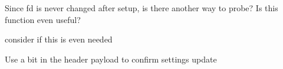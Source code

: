 
\begin{DoxyRefList}
\item[\label{todo__todo000001}%
\Hypertarget{todo__todo000001}%
Member \hyperlink{classtoposens__driver_1_1Serial_a43c68993fde1277eff277428d17b47c0}{toposens\+\_\+driver\+:\+:Serial\+:\+:is\+Alive} ()]Since fd is never changed after setup, is there another way to probe? Is this function even useful?  
\item[\label{todo__todo000002}%
\Hypertarget{todo__todo000002}%
Member \hyperlink{classtoposens__driver_1_1Serial_a4837c845aedc74cc1b9a62acb71b0cef}{toposens\+\_\+driver\+:\+:Serial\+:\+:is\+Calibrating} ()]consider if this is even needed  
\item[\label{todo__todo000003}%
\Hypertarget{todo__todo000003}%
Member \hyperlink{classtoposens__driver_1_1Serial_aea7a45dbb1d2edb0b5e60b1cae10584b}{toposens\+\_\+driver\+:\+:Serial\+:\+:send} (char $\ast$bytes)]Use a bit in the header payload to confirm settings update 
\end{DoxyRefList}